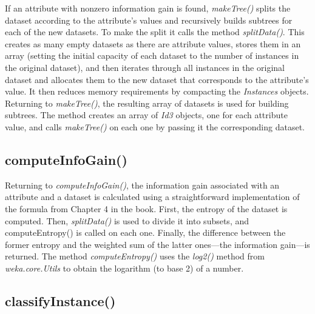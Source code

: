If an attribute with nonzero information gain is found, \textit{makeTree()}
splits the dataset according to the attribute's values and recursively
builds subtrees for each of the new datasets. To make the split it
calls the method \textit{splitData()}. This creates as many empty datasets as
there are attribute values, stores them in an array (setting the
initial capacity of each dataset to the number of instances in the
original dataset), and then iterates through all instances in the
original dataset and allocates them to the new dataset that
corresponds to the attribute's value. It then reduces memory
requirements by compacting the \textit{Instances} objects. Returning to
\textit{makeTree()}, the resulting array of datasets is used for building
subtrees. The method creates an array of \textit{Id3} objects, one for
each attribute value, and calls \textit{makeTree()} on each one by
passing it the corresponding dataset.

\subsection{computeInfoGain()}

Returning to \textit{computeInfoGain()}, the information gain
associated with an attribute and a dataset is calculated using a
straightforward implementation of the formula from Chapter 4 in the book. First,
the entropy of the dataset is computed. Then, \textit{splitData()} is
used to divide it into subsets, and computeEntropy() is called on each
one. Finally, the difference between the former entropy and the
weighted sum of the latter ones---the information gain---is
returned. The method \textit{computeEntropy()} uses
the \textit{log2()} method from \textit{weka.core.Utils} to obtain the
logarithm (to base 2) of a number.

\subsection{classifyInstance()}

